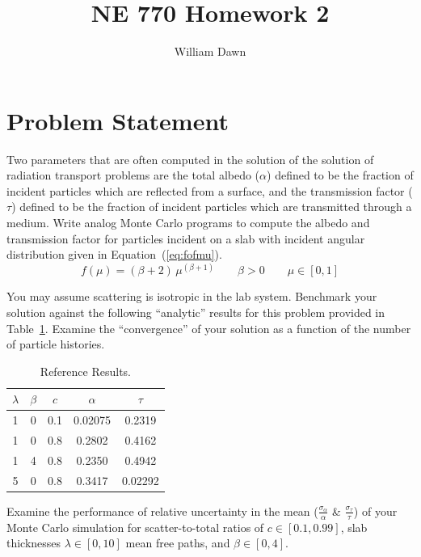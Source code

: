 \documentclass{article}
\newcommand{\albedo}{\alpha}
\newcommand{\transmission}{\tau}
\newcommand{\eref}[1]{Equation~(\ref{#1})}
\newcommand{\tref}[1]{Table~\ref{#1}}
\begin{document}
\title{NE 770 Homework 2}
\author{William Dawn}
\maketitle

\section{Problem Statement}
  Two parameters that are often computed in the solution of the solution of 
  radiation transport problems are the total albedo ($\albedo$) defined to be 
  the fraction of incident particles which are reflected from a surface, and the 
  transmission factor ($\transmission$) defined to be the fraction of incident 
  particles which are transmitted through a medium. Write analog Monte Carlo 
  programs to compute the albedo and transmission factor for particles incident 
  on a slab with incident angular distribution given in \eref{eq:fofmu}.
  \begin{equation}
    \label{eq:fofmu}
    f(\mu) = (\beta + 2) \, \mu^{(\beta+1)} \qquad \beta > 0 \qquad \mu \in [0,1]
  \end{equation}

  You may assume scattering is isotropic in the lab system. Benchmark your
  solution against the following ``analytic'' results for this problem provided 
  in \tref{tab:analytic}. Examine the ``convergence'' of your solution as a 
  function of the number of particle histories.

  \begin{table}
    \caption{Reference Results.}
    \label{tab:analytic}
    \begin{center}
      \begin{tabular}{ccccc}
        \toprule
        $\lambda$ & $\beta$ & $c$ & $\albedo$ & $\transmission$ \\
        \midrule
        1 & 0 & 0.1 & 0.02075 & 0.2319  \\
        1 & 0 & 0.8 & 0.2802  & 0.4162  \\
        1 & 4 & 0.8 & 0.2350  & 0.4942  \\
        5 & 0 & 0.8 & 0.3417  & 0.02292 \\
        \bottomrule
      \end{tabular}
    \end{center}
  \end{table}

  Examine the performance of relative uncertainty in the mean
  ($\frac{\sigma_{\albedo}}{\albedo}$ \&
  $\frac{\sigma_{\transmission}}{\transmission}$) of your Monte Carlo simulation
  for scatter-to-total ratios of $c \in [0.1,0.99]$, slab thicknesses $\lambda
  \in [0,10]$ mean free paths, and $\beta \in [0,4]$.
\end{document}
